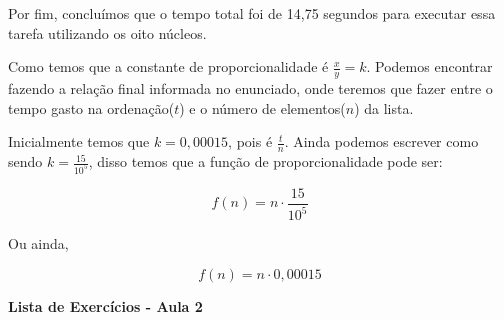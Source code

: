 \documentclass{scrartcl} %
\begin{document}
\begin{multicols}{2}
\begin{question}
Por fim, concluímos que o tempo total foi de 14,75 segundos para executar essa tarefa utilizando os oito núcleos.
\end{question}

\begin{question}
Como temos que a constante de proporcionalidade é \(\frac{x}{y} = k\). Podemos encontrar fazendo a relação final informada no enunciado, onde teremos que fazer entre o tempo gasto na ordenação(\(t\)) e o número de elementos(\(n\)) da lista.\par
Inicialmente temos que \(k = 0,00015\), pois  é \(\frac{t}{n}\). Ainda podemos escrever como sendo \(k = \frac{15}{10^5}\), disso temos que a função de proporcionalidade pode ser:

\[f(n) = n \cdot \frac{15}{10^5}\]

Ou ainda,

\[f(n) = n \cdot 0,00015\]

\end{question}
\end{multicols}

\newpage

\begin{center}
\textbf{Lista de Exercícios - Aula 2}
\end{center}


\end{document}
